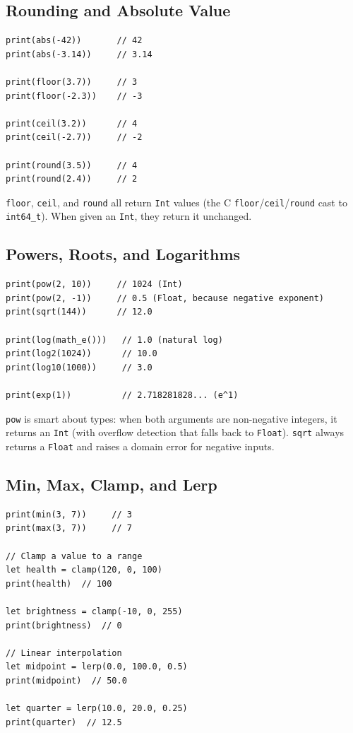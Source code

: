 \subsection{Rounding and Absolute Value}\label{sec:math-rounding}

\begin{lstlisting}[language=Lattice, caption={Rounding functions}]
print(abs(-42))       // 42
print(abs(-3.14))     // 3.14

print(floor(3.7))     // 3
print(floor(-2.3))    // -3

print(ceil(3.2))      // 4
print(ceil(-2.7))     // -2

print(round(3.5))     // 4
print(round(2.4))     // 2
\end{lstlisting}

\lstinline|floor|, \lstinline|ceil|, and \lstinline|round| all return
\lstinline|Int| values (the C \texttt{floor}/\texttt{ceil}/\texttt{round}
cast to \texttt{int64\_t}). When given an \lstinline|Int|, they return it
unchanged.

\subsection{Powers, Roots, and Logarithms}\label{sec:math-powers}

\begin{lstlisting}[language=Lattice, caption={Powers and roots}]
print(pow(2, 10))     // 1024 (Int)
print(pow(2, -1))     // 0.5 (Float, because negative exponent)
print(sqrt(144))      // 12.0

print(log(math_e()))   // 1.0 (natural log)
print(log2(1024))      // 10.0
print(log10(1000))     // 3.0

print(exp(1))          // 2.718281828... (e^1)
\end{lstlisting}

\lstinline|pow| is smart about types: when both arguments are non-negative
integers, it returns an \lstinline|Int| (with overflow detection that falls
back to \lstinline|Float|). \lstinline|sqrt| always returns a
\lstinline|Float| and raises a domain error for negative inputs.

\subsection{Min, Max, Clamp, and Lerp}\label{sec:math-minmax}

\begin{lstlisting}[language=Lattice, caption={Clamping and interpolation}]
print(min(3, 7))     // 3
print(max(3, 7))     // 7

// Clamp a value to a range
let health = clamp(120, 0, 100)
print(health)  // 100

let brightness = clamp(-10, 0, 255)
print(brightness)  // 0

// Linear interpolation
let midpoint = lerp(0.0, 100.0, 0.5)
print(midpoint)  // 50.0

let quarter = lerp(10.0, 20.0, 0.25)
print(quarter)  // 12.5
\end{lstlisting}

